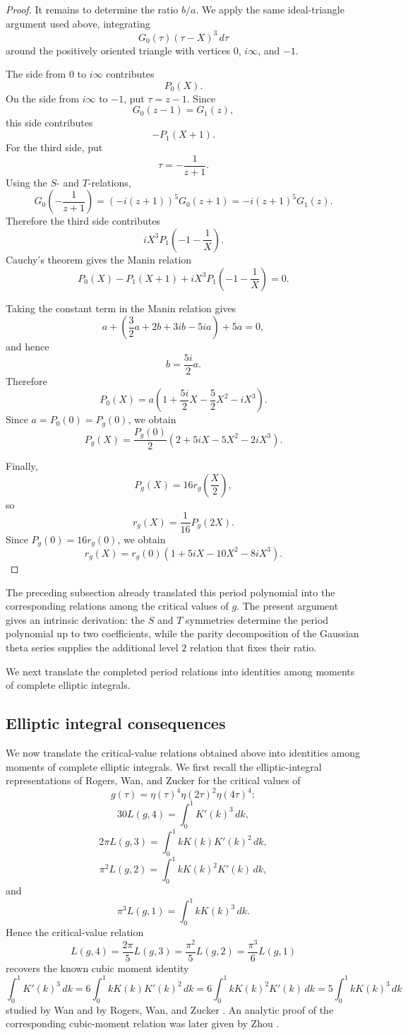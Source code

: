\documentclass[preprint,12pt]{elsarticle}
\theoremstyle{definition}
\theoremstyle{remark}
\begin{document}
\begin{proof}
	It remains to determine the ratio $b/a$.  We apply the same ideal-triangle argument used above, integrating
	\[
	G_0(\tau)(\tau-X)^3\,d\tau
	\]
	around the positively oriented triangle with vertices $0$, $i\infty$, and $-1$.
	
	The side from $0$ to $i\infty$ contributes
	\[
	P_0(X).
	\]
	On the side from $i\infty$ to $-1$, put $\tau=z-1$.  Since
	\[
	G_0(z-1)=G_1(z),
	\]
	this side contributes
	\[
	-P_1(X+1).
	\]
	For the third side, put
	\[
	\tau=-\frac{1}{z+1}.
	\]
	Using the $S$- and $T$-relations,
	\[
	G_0\left(-\frac{1}{z+1}\right)
	=
	(-i(z+1))^5G_0(z+1)
	=
	-i(z+1)^5G_1(z).
	\]
	Therefore the third side contributes
	\[
	iX^3P_1\left(-1-\frac{1}{X}\right).
	\]
	Cauchy's theorem gives the Manin relation
	\[
	P_0(X)-P_1(X+1)
	+iX^3P_1\left(-1-\frac{1}{X}\right)=0.
	\]
	
Taking the constant term in the Manin relation gives
\[
a+\left(\frac{3}{2}a+2b+3ib-5ia\right)+5a=0,
\]
and hence
\[
b=\frac{5i}{2}a.
\]
Therefore
\[
P_0(X)=a\left(1+\frac{5i}{2}X-\frac{5}{2}X^2-iX^3\right).
\]
Since $a=P_0(0)=P_g(0)$, we obtain
\[
P_g(X)=\frac{P_g(0)}{2}\left(2+5iX-5X^2-2iX^3\right).
\]
	
	Finally,
	\[
	P_g(X)=16r_g\left(\frac{X}{2}\right),
	\]
	so
	\[
	r_g(X)=\frac{1}{16}P_g(2X).
	\]
	Since $P_g(0)=16r_g(0)$, we obtain
	\[
	r_g(X)
	=
	r_g(0)\left(1+5iX-10X^2-8iX^3\right).
	\]
\end{proof}

The preceding subsection already translated this period polynomial into the corresponding relations among the critical values of $g$.  The present argument gives an intrinsic derivation: the $S$ and $T$ symmetries determine the period polynomial up to two coefficients, while the parity decomposition of the Gaussian theta series supplies the additional level $2$ relation that fixes their ratio.

We next translate the completed period relations into identities among moments of complete elliptic integrals.
\subsection{Elliptic integral consequences}

We now translate the critical-value relations obtained above into identities among moments of complete elliptic integrals.  We first recall the elliptic-integral representations of Rogers, Wan, and Zucker \cite{MR3338042} for the critical values of
\[
g(\tau)=\eta(\tau)^4\eta(2\tau)^2\eta(4\tau)^4:
\]
\[
30L(g,4)=\int_0^1 K'(k)^3\,dk,
\]
\[
2\pi L(g,3)=\int_0^1 kK(k)K'(k)^2\,dk,
\]
\[
\pi^2L(g,2)=\int_0^1 kK(k)^2K'(k)\,dk,
\]
and
\[
\pi^3L(g,1)=\int_0^1 kK(k)^3\,dk.
\]
Hence the critical-value relation
\[
L(g,4)=\frac{2\pi}{5}L(g,3)=\frac{\pi^2}{5}L(g,2)=\frac{\pi^3}{6}L(g,1)
\]
recovers the known cubic moment identity
\[
\int_0^1 K'(k)^3\,dk
=6\int_0^1 kK(k)K'(k)^2\,dk
=6\int_0^1 kK(k)^2K'(k)\,dk
=5\int_0^1 kK(k)^3\,dk
\]
studied by Wan \cite{MR2845511} and by Rogers, Wan, and Zucker \cite{MR3338042}. An analytic proof of the corresponding cubic-moment relation was later given by Zhou \cite{MR3231318}.
\end{document}
